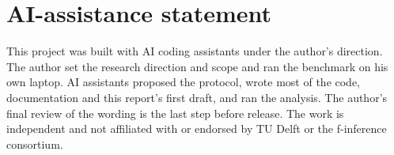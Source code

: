 \documentclass[10pt,twocolumn]{article}
\begin{document}
\section*{AI-assistance statement}
This project was built with AI coding assistants under the author's direction. The author set the research direction and scope and ran the benchmark on his own laptop. AI assistants proposed the protocol, wrote most of the code, documentation and this report's first draft, and ran the analysis. The author's final review of the wording is the last step before release. The work is independent and not affiliated with or endorsed by TU Delft or the f-inference consortium.

\small

\end{document}
